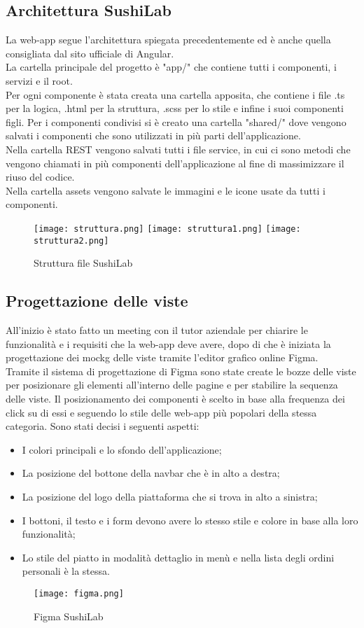 \subsection{Architettura SushiLab}
La web-app segue l'architettura spiegata precedentemente ed è anche quella consigliata dal sito ufficiale di Angular.\\
La cartella principale del progetto è "app/" che contiene tutti i componenti, i servizi e il root.\\ 
Per ogni componente è stata creata una cartella apposita, che contiene i file .ts per la logica, .html per la struttura, .scss per lo stile e infine i suoi componenti figli. Per i componenti condivisi si è creato una cartella "shared/" dove vengono salvati i componenti che sono utilizzati in più parti dell'applicazione.\\
Nella cartella REST vengono salvati tutti i file service, in cui ci sono metodi che vengono chiamati in più componenti dell'applicazione al fine di massimizzare il riuso del codice.\\
Nella cartella assets vengono salvate le immagini e le icone usate da tutti i componenti.\\
\begin{figure}[H]
    \centering
    \texttt{[image: struttura.png]}
    \texttt{[image: struttura1.png]}
    \texttt{[image: struttura2.png]}
    \caption{Struttura file SushiLab}
\end{figure}
\subsection{Progettazione delle viste}
All'inizio è stato fatto un meeting con il tutor aziendale per chiarire le funzionalità e i requisiti che la web-app deve avere, dopo di che è iniziata la progettazione dei \gls{mockg} delle viste tramite l'editor grafico online Figma.\\
Tramite il sistema di progettazione di Figma sono state create le bozze delle viste per posizionare gli elementi all'interno delle pagine e per stabilire la sequenza delle viste.
Il posizionamento dei componenti è scelto in base alla frequenza dei click su di essi e seguendo lo stile delle web-app più popolari della stessa categoria.
Sono stati decisi i seguenti aspetti:
\begin{itemize}
    \item I colori principali e lo sfondo dell'applicazione;
    \item La posizione del bottone della navbar che è in alto a destra;
    \item La posizione del logo della piattaforma che si trova in alto a sinistra;
    \item I bottoni, il testo e i form devono avere lo stesso stile e colore in base alla loro funzionalità;
    \item Lo stile del piatto in modalità dettaglio in menù e nella lista degli ordini personali è la stessa.
\end{itemize}
\begin{figure}[H]
    \centering
    \texttt{[image: figma.png]}
    \caption{Figma SushiLab}
\end{figure}
